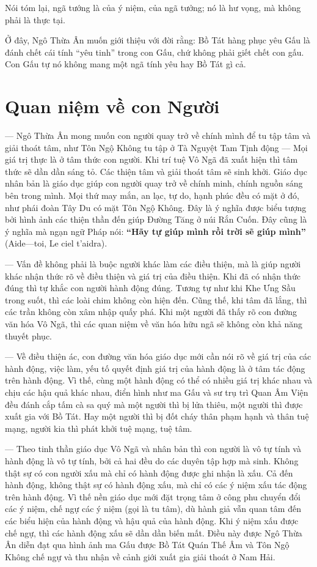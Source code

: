 Nói tóm lại, ngã tướng là của ý niệm, của ngã tưởng; nó là hư vọng, mà không phải là thực tại.

Ở đây, Ngô Thừa Ân muốn giới thiệu với đời rằng: Bồ Tát hàng phục yêu Gấu là đánh chết cái tính ``yêu tinh'' trong con Gấu, chứ không phải giết chết con gấu. Con Gấu tự nó không mang một ngã tính yêu hay Bồ Tát gì cả.


\section{Quan niệm về con Người} %
\label{sec:15_con_nguoi}

— Ngô Thừa Ân mong muốn con người quay trở về chính mình để tu tập tâm và giải thoát tâm, như Tôn Ngộ Không tu tập ở Tà Nguyệt Tam Tịnh động — Mọi giá trị thực là ở tâm thức con người. Khi trí tuệ Vô Ngã đã xuất hiện thì tâm thức sẽ dần dần sáng tỏ. Các thiện tâm và giải thoát tâm sẽ sinh khởi. Giáo dục nhân bản là giáo dục giúp con người quay trở về chính minh, chính nguồn sáng bên trong mình. Mọi thứ may mắn, an lạc, tự do, hạnh phúc đều có mặt ở đó, như phái đoàn Tây Du có mặt Tôn Ngộ Không. Đây là ý nghĩa được biểu tượng bởi hình ảnh các thiện thần đến giúp Đường Tăng ở núi Rắn Cuốn. Đây cũng là ý nghĩa mà ngạn ngữ Pháp nói: {\bf ``Hãy tự giúp mình rồi trời sẽ giúp mình''} (Aide—toi, Le ciel t'aidra).

— Vấn đề không phải là buộc người khác làm các điều thiện, mà là giúp người khác nhận thức rõ về điều thiện và giá trị của điều thiện. Khi đã có nhận thức đúng thì tự khắc con người hành động đúng. Tương tự như khi Khe Ưng Sầu trong suốt, thì các loài chim không còn hiện đến. Cũng thế, khi tâm đã lắng, thì các trần không còn xâm nhập quấy phá. Khi một người đã thấy rõ con đường văn hóa Vô Ngã, thì các quan niệm về văn hóa hữu ngã sẽ không còn khả năng thuyết phục.

— Về điều thiện ác, con đường văn hóa giáo dục mới cần nói rõ về giá trị của các hành động, việc làm, yếu tố quyết định giá trị của hành động là ở tâm tác động trên hành động. Vì thế, cùng một hành động có thể có nhiều giá trị khác nhau và chịu các hậu quả khác nhau, điển hình như ma Gấu và sư trụ trì Quan Âm Viện đều đánh cắp tấm cà sa quý mà một người thì bị lửa thiêu, một người thì được xuất gia với Bồ Tát. Hay một người thì bị đốt cháy thân phạm hạnh và thân tuệ mạng, người kia thì phát khởi tuệ mạng, tuệ tâm.

— Theo tinh thần giáo dục Vô Ngã và nhân bản thì con người là vô tự tính và hành động là vô tự tính, bởi cả hai đều do các duyên tập hợp mà sinh. Không thật sự có con người xấu mà chỉ có hành động được ghi nhận là xấu. Cả đến hành động, không thật sự có hành động xấu, mà chỉ có các ý niệm xấu tác động trên hành động. Vì thế nền giáo dục mới đặt trọng tâm ở công phu chuyển đổi các ý niệm, chế ngự các ý niệm (gọi là tu tâm), dù hành giả vẫn quan tâm đến các biểu hiện của hành động và hậu quả của hành động. Khi ý niệm xấu được chế ngự, thì các hành động xấu sẽ dần dần biến mất. Điều này được Ngô Thừa Ân diễn đạt qua hình ảnh ma Gấu được Bồ Tát Quán Thế Âm và Tôn Ngộ Không chế ngự và thu nhận về cảnh giới xuất gia giải thoát ở Nam Hải.


